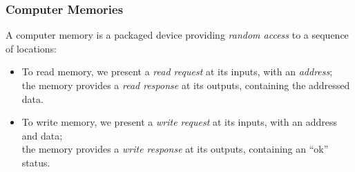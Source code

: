 \begin{frame}
\frametitle{Computer Memories}

\begin{center}
\end{center}

\vspace*{2ex}

A computer memory is a packaged device providing \emph{random access}
to a sequence of locations:

\begin{itemize}

 \item To read memory, we present a \emph{read request} at its inputs,
       with an \emph{address}; \\
       the memory provides a \emph{read response} at its outputs,
       containing the addressed data.

 \pause

 \item To write memory, we present a \emph{write request} at its
       inputs, with an address and data; \\
       the memory provides a \emph{write response} at its outputs,
       containing an ``ok'' status.

\end{itemize}

\end{frame}


